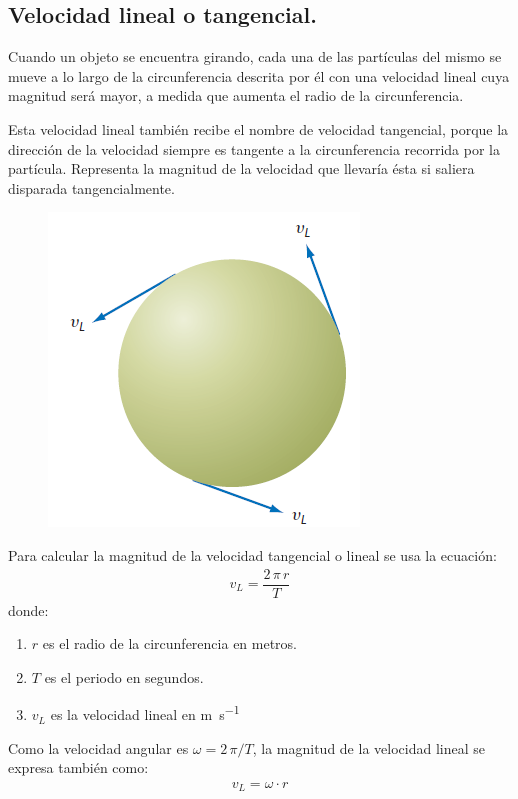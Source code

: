 \documentclass[12pt]{article}
\begin{document}
\subsection{Velocidad lineal o tangencial.}

Cuando un objeto se encuentra girando,  cada una de las partículas del mismo se mueve a lo largo de la circunferencia descrita por él con una velocidad lineal cuya magnitud será mayor, a medida que aumenta el radio de la circunferencia.

Esta velocidad lineal también recibe el nombre de velocidad tangencial, porque la dirección de la velocidad siempre es tangente a la circunferencia recorrida por la partícula. Representa la magnitud de la velocidad que llevaría ésta si saliera disparada tangencialmente.
\begin{figure}[H]
    \centering
    \includegraphics[scale=0.75]{Imagenes/Movimiento_Circular_03.png}
\end{figure}

Para calcular la magnitud de la velocidad tangencial o lineal se usa la ecuación:
\begin{align*}
v_{L} = \dfrac{2 \, \pi \, r}{T}
\end{align*}
donde:
\begin{enumerate}[label=\alph*)]
\item $r$ es el radio de la circunferencia en metros.
\item $T$ es el periodo en segundos.
\item $v_{L}$ es la velocidad lineal en \unit{\meter\per\second}
\end{enumerate}

Como la velocidad angular es $\omega = 2 \, \pi /T$, la magnitud de la velocidad lineal se expresa también como:
\begin{align*}
v_{L} = \omega \cdot r
\end{align*}
\end{document}
